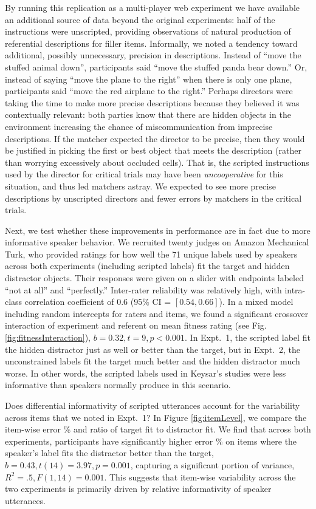 \documentclass[manuscript]{stjour}
\begin{document}
By running this replication as a multi-player web experiment we have available an additional source of data beyond the original experiments: half of the instructions were unscripted, providing observations of natural production of referential descriptions for filler items. 
Informally, we noted a tendency toward additional, possibly unnecessary, precision in descriptions. Instead of ``move the stuffed animal down'', participants said ``move the stuffed panda bear down.'' Or, instead of saying ``move the plane to the right'' when there is only one plane, participants said ``move the red airplane to the right.'' 
Perhaps directors were taking the time to make more precise descriptions because they believed it was contextually relevant: both parties know that there are hidden objects in the environment increasing the chance of miscommunication from imprecise descriptions. 
If the matcher expected the director to be precise, then they would be justified in picking the first or best object that meets the description (rather than worrying excessively about occluded cells). 
That is, the scripted instructions used by the director for critical trials may have been \emph{uncooperative} for this situation, and thus led matchers astray. 
We expected to see more precise descriptions by unscripted directors and fewer errors by matchers in the critical trials.

Next, we test whether these improvements in performance are in fact due to more informative speaker behavior. We recruited twenty judges on Amazon Mechanical Turk, who provided ratings for how well the 71 unique labels used by speakers across both experiments (including scripted labels) fit the target and hidden distractor objects. Their responses were given on a slider with endpoints labeled ``not at all'' and ``perfectly.''  Inter-rater reliability was relatively high, with intra-class correlation coefficient of $0.6$ (95\% CI = $[0.54, 0.66]$). In a mixed model including random intercepts for raters and items, we found a significant crossover interaction of experiment and referent on mean fitness rating (see Fig. \ref{fig:fitnessInteraction}), $b = 0.32, t = 9, p < 0.001$. In Expt.~1, the scripted label fit the hidden distractor just as well or better than the target, but in Expt.~2, the unconstrained labels fit the target much better and the hidden distractor much worse. In other words, the scripted labels used in Keysar's studies were less informative than speakers normally produce in this scenario.

Does differential informativity of scripted utterances account for the variability across items that we noted in Expt.~1? In Figure \ref{fig:itemLevel}, we compare the item-wise error \% and ratio of target fit to distractor fit. We find that across both experiments, participants have significantly higher error \% on items where the speaker's label fits the distractor better than the target, $b = 0.43, t(14) = 3.97, p = 0.001$, capturing a significant portion of variance, $R^2 = .5, F(1,14) = 0.001$. This suggests that item-wise variability across the two experiments is primarily driven by relative informativity of speaker utterances. 
\end{document}
